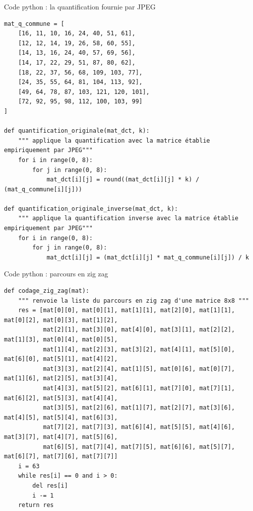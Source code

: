 \documentclass[xcolor=dvipsnames]{beamer}
\begin{document}
\begin{frame}[fragile]{Code python : la quantification fournie par JPEG}
    \begin{lstlisting}[style=pythonStyle]
mat_q_commune = [
    [16, 11, 10, 16, 24, 40, 51, 61],
    [12, 12, 14, 19, 26, 58, 60, 55],
    [14, 13, 16, 24, 40, 57, 69, 56],
    [14, 17, 22, 29, 51, 87, 80, 62],
    [18, 22, 37, 56, 68, 109, 103, 77],
    [24, 35, 55, 64, 81, 104, 113, 92],
    [49, 64, 78, 87, 103, 121, 120, 101],
    [72, 92, 95, 98, 112, 100, 103, 99]
]

def quantification_originale(mat_dct, k):
    """ applique la quantification avec la matrice établie empiriquement par JPEG"""
    for i in range(0, 8):
        for j in range(0, 8):
            mat_dct[i][j] = round((mat_dct[i][j] * k) / (mat_q_commune[i][j]))

def quantification_originale_inverse(mat_dct, k):
    """ applique la quantification inverse avec la matrice établie empiriquement par JPEG"""
    for i in range(0, 8):
        for j in range(0, 8):
            mat_dct[i][j] = (mat_dct[i][j] * mat_q_commune[i][j]) / k

    \end{lstlisting}
\end{frame}

\begin{frame}[fragile]{Code python : parcours en zig zag}
    \begin{lstlisting}[style=pythonStyle]
def codage_zig_zag(mat):
    """ renvoie la liste du parcours en zig zag d'une matrice 8x8 """
    res = [mat[0][0], mat[0][1], mat[1][1], mat[2][0], mat[1][1], mat[0][2], mat[0][3], mat[1][2],
           mat[2][1], mat[3][0], mat[4][0], mat[3][1], mat[2][2], mat[1][3], mat[0][4], mat[0][5],
           mat[1][4], mat[2][3], mat[3][2], mat[4][1], mat[5][0], mat[6][0], mat[5][1], mat[4][2],
           mat[3][3], mat[2][4], mat[1][5], mat[0][6], mat[0][7], mat[1][6], mat[2][5], mat[3][4],
           mat[4][3], mat[5][2], mat[6][1], mat[7][0], mat[7][1], mat[6][2], mat[5][3], mat[4][4],
           mat[3][5], mat[2][6], mat[1][7], mat[2][7], mat[3][6], mat[4][5], mat[5][4], mat[6][3],
           mat[7][2], mat[7][3], mat[6][4], mat[5][5], mat[4][6], mat[3][7], mat[4][7], mat[5][6],
           mat[6][5], mat[7][4], mat[7][5], mat[6][6], mat[5][7], mat[6][7], mat[7][6], mat[7][7]]
    i = 63
    while res[i] == 0 and i > 0:
        del res[i]
        i -= 1
    return res
    \end{lstlisting}
\end{frame}
\end{document}
